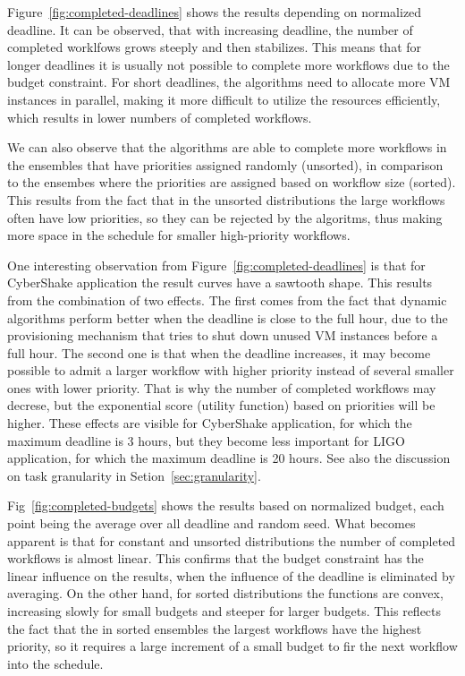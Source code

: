 \documentclass[preprint,5p]{elsarticle}
\begin{document}
Figure~\ref{fig:completed-deadlines} shows the results depending on normalized
deadline. It can be observed, that with increasing deadline, the number of
completed worklfows grows steeply and then stabilizes. This means that for
longer deadlines it is usually not possible to complete more workflows due to
the budget constraint. For short deadlines, the algorithms need to allocate more
VM instances in parallel, making it more difficult to utilize the resources
efficiently, which results in lower numbers of completed workflows.

We can also observe that the algorithms are able to complete more workflows in
the ensembles that have priorities assigned randomly (unsorted), in comparison
to the ensembes where the priorities are assigned based on workflow size
(sorted). This results from the fact that in the unsorted distributions the large
workflows often have low priorities, so they can be rejected by the algoritms,
thus making more space in the schedule for smaller high-priority workflows.

One interesting observation from Figure~\ref{fig:completed-deadlines} is that for
CyberShake application the result curves have a sawtooth shape. This results
from the combination of two effects. The first comes from the fact that dynamic
algorithms perform better when the deadline is close to the full hour, due to
the provisioning mechanism that tries to shut down unused VM instances before a
full hour. The second one is that when the deadline increases, it may become
possible to admit a larger workflow with higher priority instead of several
smaller ones with lower priority. That is why the number of completed workflows
may decrese, but the exponential score (utility function) based on priorities
will be higher. These effects are visible for CyberShake application, for which
the maximum deadline is 3 hours, but they become less important for LIGO
application, for which the maximum deadline is 20 hours. See also the discussion
on task granularity in Setion~\ref{sec:granularity}.

Fig~\ref{fig:completed-budgets} shows the results based on normalized budget,
each point being the average over all deadline and random seed. What becomes
apparent is that for constant and unsorted distributions the number of completed
workflows is almost linear. This confirms that the budget constraint has the
linear influence on the results, when the influence of the deadline is
eliminated by averaging. On the other hand, for sorted distributions the
functions are convex, increasing slowly for small budgets and steeper for larger
budgets. This reflects the fact that the in sorted ensembles the largest
workflows have the highest priority, so it requires a large increment of a small
budget to fir the next workflow into the schedule.
\end{document}
